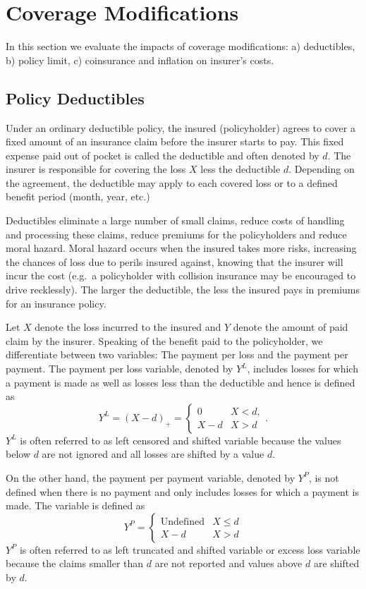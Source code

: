 \documentclass[]{book}
\theoremstyle{definition}
\theoremstyle{definition}
\theoremstyle{definition}
\theoremstyle{remark}
\begin{document}
\section{Coverage Modifications}\label{coverage-modifications}

In this section we evaluate the impacts of coverage modifications: a)
deductibles, b) policy limit, c) coinsurance and inflation on insurer's
costs.

\subsection{Policy Deductibles}\label{PolicyDeduct}

Under an ordinary deductible policy, the insured (policyholder) agrees
to cover a fixed amount of an insurance claim before the insurer starts
to pay. This fixed expense paid out of pocket is called the deductible
and often denoted by \(d\). The insurer is responsible for covering the
loss \(X\) less the deductible \(d\). Depending on the agreement, the
deductible may apply to each covered loss or to a defined benefit period
(month, year, etc.)

Deductibles eliminate a large number of small claims, reduce costs of
handling and processing these claims, reduce premiums for the
policyholders and reduce moral hazard. Moral hazard occurs when the
insured takes more risks, increasing the chances of loss due to perils
insured against, knowing that the insurer will incur the cost (e.g.~a
policyholder with collision insurance may be encouraged to drive
recklessly). The larger the deductible, the less the insured pays in
premiums for an insurance policy.

Let \(X\) denote the loss incurred to the insured and \(Y\) denote the
amount of paid claim by the insurer. Speaking of the benefit paid to the
policyholder, we differentiate between two variables: The payment per
loss and the payment per payment. The payment per loss variable, denoted
by \(Y^{L}\), includes losses for which a payment is made as well as
losses less than the deductible and hence is defined as
\[Y^{L} = \left( X - d \right)_{+} 
= \left\{ \begin{array}{cc}
0 & X < d, \\
X - d & X > d  
\end{array} \right. .\] \(Y^{L}\) is often referred to as left censored
and shifted variable because the values below \(d\) are not ignored and
all losses are shifted by a value \(d\).

On the other hand, the payment per payment variable, denoted by
\(Y^{P}\), is not defined when there is no payment and only includes
losses for which a payment is made. The variable is defined as
\[Y^{P} = \left\{ \begin{matrix}
\text{Undefined} & X \le d \\
X - d & X > d 
\end{matrix} \right. \] \(Y^{P}\) is often referred to as left truncated
and shifted variable or excess loss variable because the claims smaller
than \(d\) are not reported and values above \(d\) are shifted by \(d\).
\end{document}
